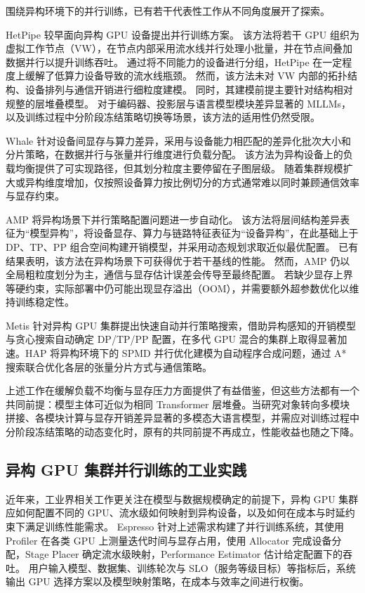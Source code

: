 围绕异构环境下的并行训练，已有若干代表性工作从不同角度展开了探索。

HetPipe\cite{hetpipe2020} 较早面向异构 GPU 设备提出并行训练方案。
该方法将若干 GPU 组织为虚拟工作节点（VW），在节点内部采用流水线并行处理小批量，并在节点间叠加数据并行以提升训练吞吐。
通过将不同能力的设备进行分组，HetPipe 在一定程度上缓解了低算力设备导致的流水线瓶颈。
然而，该方法未对 VW 内部的拓扑结构、设备排列与通信开销进行细粒度建模。
同时，其建模前提主要针对结构相对规整的层堆叠模型。
对于编码器、投影层与语言模型模块差异显著的 MLLMs，以及训练过程中分阶段冻结策略切换等场景，该方法的适用性仍然受限。

Whale\cite{whale} 针对设备间显存与算力差异，采用与设备能力相匹配的差异化批次大小和分片策略，在数据并行与张量并行维度进行负载分配。
该方法为异构设备上的负载均衡提供了可实现路径，但其划分粒度主要停留在子图层级。
随着集群规模扩大或异构维度增加，仅按照设备算力按比例切分的方式通常难以同时兼顾通信效率与显存约束。

AMP\cite{amp2022} 将异构场景下并行策略配置问题进一步自动化。
该方法将层间结构差异表征为“模型异构”，将设备显存、算力与链路特征表征为“设备异构”，在此基础上于 DP、TP、PP 组合空间构建开销模型，并采用动态规划求取近似最优配置。
已有结果表明，该方法在异构场景下可获得优于若干基线的性能。
然而，AMP 仍以全局粗粒度划分为主，通信与显存估计误差会传导至最终配置。
若缺少显存上界等硬约束，实际部署中仍可能出现显存溢出（OOM），并需要额外超参数优化以维持训练稳定性。

Metis\cite{metis2024} 针对异构 GPU 集群提出快速自动并行策略搜索，借助异构感知的开销模型与贪心搜索自动确定 DP/TP/PP 配置，在多代 GPU 混合的集群上取得显著加速。HAP\cite{hap2024} 将异构环境下的 SPMD 并行优化建模为自动程序合成问题，通过 A* 搜索联合优化各层的张量分片方式与通信策略。

上述工作在缓解负载不均衡与显存压力方面提供了有益借鉴，但这些方法都有一个共同前提：模型主体可近似为相同 Transformer 层堆叠。当研究对象转向多模块拼接、各模块计算与显存开销差异显著的多模态大语言模型，并需应对训练过程中分阶段冻结策略的动态变化时，原有的共同前提不再成立，性能收益也随之下降。



\subsection{异构 GPU 集群并行训练的工业实践}

近年来，工业界相关工作更关注在模型与数据规模确定的前提下，异构 GPU 集群应如何配置不同的 GPU、流水级如何映射到异构设备，以及如何在成本与时延约束下满足训练性能需求。
Espresso\cite{espresso2025} 针对上述需求构建了并行训练系统，其使用 Profiler 在各类 GPU 上测量迭代时间与显存占用，使用 Allocator 完成设备分配，Stage Placer 确定流水级映射，Performance Estimator 估计给定配置下的吞吐。
用户输入模型、数据集、训练轮次与 SLO（服务等级目标）等指标后，系统输出 GPU 选择方案以及模型映射策略，在成本与效率之间进行权衡。

